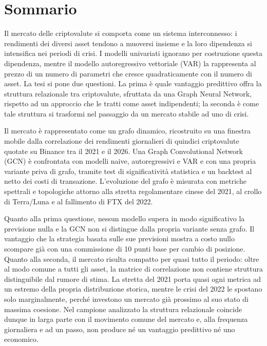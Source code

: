\chapter*{Sommario}

Il mercato delle criptovalute si comporta come un sistema interconnesso: i rendimenti dei diversi asset tendono a muoversi insieme e la loro dipendenza si intensifica nei periodi di crisi. I modelli univariati ignorano per costruzione questa dipendenza, mentre il modello autoregressivo vettoriale (VAR) la rappresenta al prezzo di un numero di parametri che cresce quadraticamente con il numero di asset. La tesi si pone due questioni. La prima è quale vantaggio predittivo offra la struttura relazionale tra criptovalute, sfruttata da una Graph Neural Network, rispetto ad un approccio che le tratti come asset indipendenti; la seconda è come tale struttura si trasformi nel passaggio da un mercato stabile ad uno di crisi.

Il mercato è rappresentato come un grafo dinamico, ricostruito su una finestra mobile dalla correlazione dei rendimenti giornalieri di quindici criptovalute quotate su Binance tra il 2021 e il 2026. Una Graph Convolutional Network (GCN) è confrontata con modelli naive, autoregressivi e VAR e con una propria variante priva di grafo, tramite test di significatività statistica e un backtest al netto dei costi di transazione. L'evoluzione del grafo è misurata con metriche spettrali e topologiche attorno alla stretta regolamentare cinese del 2021, al crollo di Terra/Luna e al fallimento di FTX del 2022.

Quanto alla prima questione, nessun modello supera in modo significativo la previsione nulla e la GCN non si distingue dalla propria variante senza grafo. Il vantaggio che la strategia basata sulle sue previsioni mostra a costo nullo scompare già con una commissione di 10 punti base per cambio di posizione. Quanto alla seconda, il mercato risulta compatto per quasi tutto il periodo: oltre al modo comune a tutti gli asset, la matrice di correlazione non contiene struttura distinguibile dal rumore di stima. La stretta del 2021 porta quasi ogni metrica ad un estremo della propria distribuzione storica, mentre le crisi del 2022 le spostano solo marginalmente, perché investono un mercato già prossimo al suo stato di massima coesione. Nel campione analizzato la struttura relazionale coincide dunque in larga parte con il movimento comune del mercato e, alla frequenza giornaliera e ad un passo, non produce né un vantaggio predittivo né uno economico.
